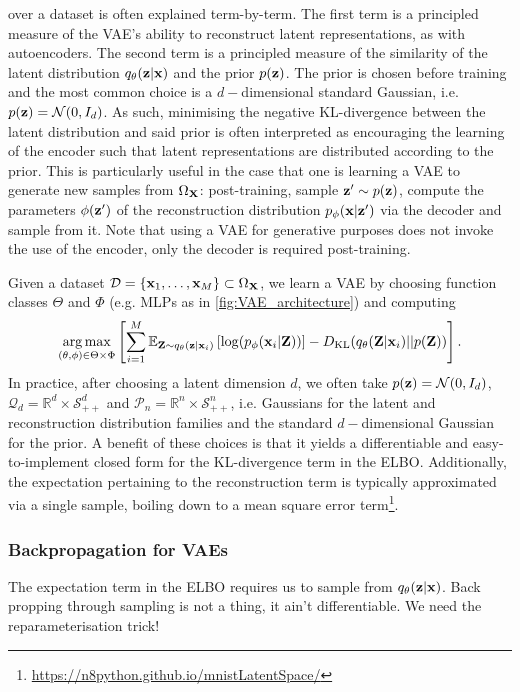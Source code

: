\documentclass[11pt]{article}
\begin{document}
over a dataset is often explained term-by-term. The first term is a principled measure of the VAE's ability to reconstruct latent representations, as with autoencoders. The second term is a principled measure of the similarity of the latent distribution $q_{\theta}(\mathbf{z}|\mathbf{x})$ and the prior $p(\mathbf{z})$. The prior is chosen before training and the most common choice is a $d-$dimensional standard Gaussian, i.e. $p(\mathbf{z})=\mathcal{N}(0,I_d)$. As such, minimising the negative KL-divergence between the latent distribution and said prior is often interpreted as encouraging the learning of the encoder such that latent representations are distributed according to the prior. This is particularly useful in the case that one is learning a VAE to generate new samples from $\Omega_{\mathbf{X}}$: post-training, sample $\mathbf{z}'\sim p(\mathbf{z})$, compute the parameters $\phi(\mathbf{z}')$ of the reconstruction distribution $p_{\phi}(\mathbf{x}|\mathbf{z}')$ via the decoder and sample from it. Note that using a VAE for generative purposes does not invoke the use of the encoder, only the decoder is required post-training.

Given a dataset $\mathcal{D}=\{\mathbf{x}_1,\dots,\mathbf{x}_M\}\subset\Omega_{\mathbf{X}}$, we learn a VAE by choosing function classes $\Theta$ and $\Phi$ (e.g. MLPs as in \autoref{fig:VAE_architecture}) and computing
$$
\operatorname*{arg\,max}_{(\theta,\phi)\in\Theta\times\Phi}
\left[
\sum_{i=1}^M
\mathbb{E}_{\mathbf{Z}\sim q_{\theta}(\mathbf{z}|\mathbf{x}_i)}\left[\log(p_{\phi}(\mathbf{x}_i|\mathbf{Z}))\right]-D_{\text{KL}}(q_{\theta}(\mathbf{Z}|\mathbf{x}_i)||p(\mathbf{Z}))
\right].
$$
In practice, after choosing a latent dimension $d$, we often take $p(\mathbf{z})=\mathcal{N}(0,I_d)$, $\mathcal{Q}_d=\mathbb{R}^d\times\mathcal{S}_{++}^d$ and $\mathcal{P}_n=\mathbb{R}^n\times\mathcal{S}_{++}^n$, i.e. Gaussians for the latent and reconstruction distribution families and the standard $d-$dimensional Gaussian for the prior. A benefit of these choices is that it yields a differentiable and easy-to-implement closed form for the KL-divergence term in the ELBO. Additionally, the expectation pertaining to the reconstruction term is typically approximated via a single sample, boiling down to a mean square error term\footnote{\url{https://n8python.github.io/mnistLatentSpace/}}.

\subsubsection{Backpropagation for VAEs}
The expectation term in the ELBO requires us to sample from $q_{\theta}(\mathbf{z}|\mathbf{x})$. Back propping through sampling is not a thing, it ain't differentiable. We need the reparameterisation trick!
\end{document}
